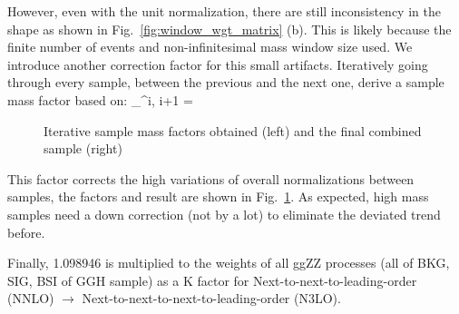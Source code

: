 However, even with the unit normalization, there are still inconsistency in the shape as shown
in Fig.~\ref{fig:window_wgt_matrix} (b). This is likely because the finite number of events
and non-infinitesimal mass window size used. We introduce another correction factor for
this small artifacts. Iteratively going through every sample, between the previous and the
next one, derive a sample mass factor based on:
\be
{}_^{i, i+1} = 
\ee

\begin{figure}[htb]
    \begin{center}
    \end{center}
    \caption{Iterative sample mass factors obtained (left) and the final combined sample (right)}
    \label{fig:LHE_rewgt}
\end{figure}

This factor corrects the high variations of overall normalizations between samples, the factors and result
are shown in Fig.~\ref{fig:LHE_rewgt}. As expected, high mass samples need a down correction (not by a lot)
to eliminate the deviated trend before.

Finally, 1.098946 is multiplied to the weights of all ggZZ processes (all of BKG, SIG, BSI
of GGH sample) as a K factor for Next-to-next-to-leading-order (NNLO) $\rightarrow$ 
Next-to-next-to-next-to-leading-order (N3LO).

